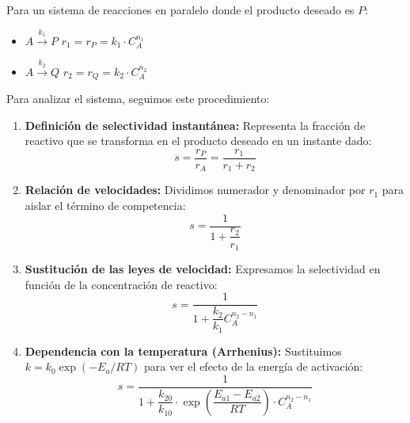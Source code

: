 \noindent Para un sistema de reacciones en paralelo donde el producto deseado es $P$:
\begin{itemize}
  \item $A \xrightarrow{k_1} P$ \hspace{5mm} $r_1 = r_P = k_1 \cdot C_A^{n_1}$
  \item $A \xrightarrow{k_2} Q$ \hspace{5mm} $r_2 = r_Q = k_2 \cdot C_A^{n_2}$
\end{itemize}

\noindent {}

\noindent Para analizar el sistema, seguimos este procedimiento:

\begin{enumerate}
  \item \textbf{Definición de selectividad instantánea:}
        Representa la fracción de reactivo que se transforma en el producto deseado en un instante dado:
        \begin{equation}
          s = \frac{r_P}{r_A} = \frac{r_1}{r_1 + r_2}
        \end{equation}

  \item \textbf{Relación de velocidades:}
        Dividimos numerador y denominador por $r_1$ para aislar el término de competencia:
        \begin{equation}
          s = \frac{1}{1 + \dfrac{r_2}{r_1}}
        \end{equation}

  \item \textbf{Sustitución de las leyes de velocidad:}
        Expresamos la selectividad en función de la concentración de reactivo:
        \begin{equation}
          s = \frac{1}{1 + \dfrac{k_2}{k_1} C_A^{n_2 - n_1}}
        \end{equation}

  \item \textbf{Dependencia con la temperatura (Arrhenius):}
        Sustituimos $k = k_0 \exp(-E_a/RT)$ para ver el efecto de la energía de activación:
        \begin{equation}
          s = \frac{1}{1 + \dfrac{k_{20}}{k_{10}} \cdot \exp \left( \dfrac{E_{a1} - E_{a2}}{RT} \right) \cdot C_A^{n_2 - n_1}}
        \end{equation}
\end{enumerate}

